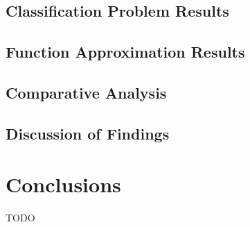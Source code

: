 \documentclass[10pt, conference]{IEEEtran}
\begin{document}
\subsection{Classification Problem Results}

\subsection{Function Approximation Results}

\subsection{Comparative Analysis}

\subsection{Discussion of Findings}

\section{Conclusions}
TODO



\end{document}
